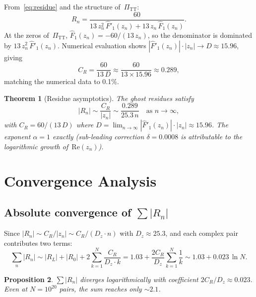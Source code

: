 \documentclass[11pt,a4paper]{article}
\newcommand{\PiTT}{\Pi_{\mathrm{TT}}}
\newcommand{\Fhat}{\hat{F}}
\newcommand{\Real}{\mathrm{Re}}
\newtheorem{theorem}{Theorem}[section]
\newtheorem{proposition}[theorem]{Proposition}
\begin{document}
From~\eqref{eq:residue} and the structure of~$\PiTT$:
\begin{equation}
  R_n = \frac{60}{13\,z_n^2\,\Fhat'_1(z_n) + 13\,z_n\,\Fhat_1(z_n)}.
\end{equation}
At the zeros of~$\PiTT$, $\Fhat_1(z_n) = -60/(13\,z_n)$, so the
denominator is dominated by $13\,z_n^2\,\Fhat'_1(z_n)$.  Numerical
evaluation shows $|\Fhat'_1(z_n)| \cdot |z_n| \to D \approx 15.96$,
giving
\begin{equation}\label{eq:CR}
  C_R = \frac{60}{13\,D} \approx \frac{60}{13 \times 15.96}
  \approx 0.289,
\end{equation}
matching the numerical data to 0.1\%.

\begin{theorem}[Residue asymptotics]
\label{thm:residue}
The ghost residues satisfy
\begin{equation}
  |R_n| \sim \frac{C_R}{|z_n|}
  \sim \frac{0.289}{25.3\,n}
  \quad\text{as } n \to \infty,
\end{equation}
with $C_R = 60/(13\,D)$ where $D = \lim_{n\to\infty}
|\Fhat'_1(z_n)| \cdot |z_n| \approx 15.96$.  The exponent
$\alpha = 1$ exactly (sub-leading correction $\delta = 0.0008$
is attributable to the logarithmic growth of~$\Real(z_n)$).
\end{theorem}


\section{Convergence Analysis}
\label{sec:convergence}

\subsection{Absolute convergence of $\sum |R_n|$}

Since $|R_n| \sim C_R/|z_n| \sim C_R/(D_z \cdot n)$ with $D_z
\approx 25.3$, and each complex pair contributes two terms:
\begin{equation}
  \sum_n |R_n|
  \sim |R_L| + |R_0| + 2\sum_{k=1}^{N} \frac{C_R}{D_z \cdot k}
  = 1.03 + \frac{2C_R}{D_z}\sum_{k=1}^{N}\frac{1}{k}
  \sim 1.03 + 0.023\,\ln N.
\end{equation}

\begin{proposition}
$\sum |R_n|$ diverges logarithmically with coefficient
$2C_R/D_z \approx 0.023$.  Even at $N = 10^{20}$ pairs, the sum
reaches only $\sim 2.1$.
\end{proposition}
\end{document}
